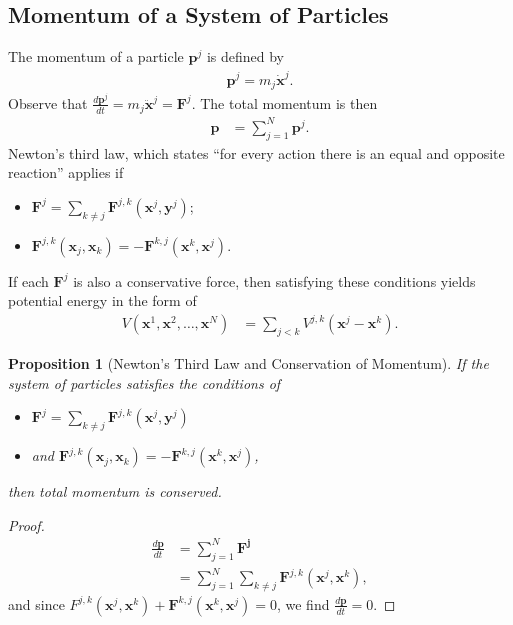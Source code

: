 \documentclass[10pt]{extarticle}
\theoremstyle{plain}
\newtheorem*{proposition}{Proposition}%
\theoremstyle{definition}
\theoremstyle{remark}
\begin{document}
  \subsection{Momentum of a System of Particles}%
  The momentum of a particle $\mathbf{p}^j$ is defined by
  \begin{align*}
    \mathbf{p}^j = m_j\mathbf{\dot{x}}^j.
  \end{align*}
  Observe that $\frac{d\mathbf{p}^j}{dt} = m_j\mathbf{\ddot{x}}^j = \mathbf{F}^j$. The total momentum is then
  \begin{align*}
    \mathbf{p} &= \sum_{j=1}^{N}\mathbf{p}^j.
  \end{align*}
  Newton's third law, which states ``for every action there is an equal and opposite reaction'' applies if 
  \begin{itemize}
    \item $\displaystyle \mathbf{F}^j = \sum_{k\neq j}\mathbf{F}^{j,k}(\mathbf{x}^j,\mathbf{y}^j)$;
    \item $\displaystyle \mathbf{F}^{j,k}(\mathbf{x}_j,\mathbf{x}_k) = -\mathbf{F}^{k,j}(\mathbf{x}^k,\mathbf{x}^j)$.
  \end{itemize}
  If each $\mathbf{F}^j$ is also a conservative force, then satisfying these conditions yields potential energy in the form of
  \begin{align*}
    V(\mathbf{x}^1,\mathbf{x}^2,\dots,\mathbf{x}^N) &= \sum_{j < k}V^{j,k}(\mathbf{x}^{j} - \mathbf{x}^{k}).
  \end{align*}
  \begin{proposition}[Newton's Third Law and Conservation of Momentum]
  If the system of particles satisfies the conditions of
  \begin{itemize}
    \item $\displaystyle \mathbf{F}^j = \sum_{k\neq j}\mathbf{F}^{j,k}(\mathbf{x}^j,\mathbf{y}^j)$
    \item and $\displaystyle \mathbf{F}^{j,k}(\mathbf{x}_j,\mathbf{x}_k) = -\mathbf{F}^{k,j}(\mathbf{x}^k,\mathbf{x}^j)$,
  \end{itemize}
  then total momentum is conserved.
  \end{proposition}
  \begin{proof}
      \begin{align*}
        \frac{d\mathbf{p}}{dt} &= \sum_{j=1}^{N}\mathbf{F^{j}}\\
                            &= \sum_{j=1}^{N}\sum_{k\neq j}\mathbf{F}^{j,k}(\mathbf{x}^j,\mathbf{x}^{k}),
      \end{align*}
      and since $F^{j,k}(\mathbf{x}^j,\mathbf{x}^k) + \mathbf{F}^{k,j}(\mathbf{x}^k,\mathbf{x}^j) = 0$, we find $\frac{d\mathbf{p}}{dt} = 0$.
  \end{proof}
\end{document}
